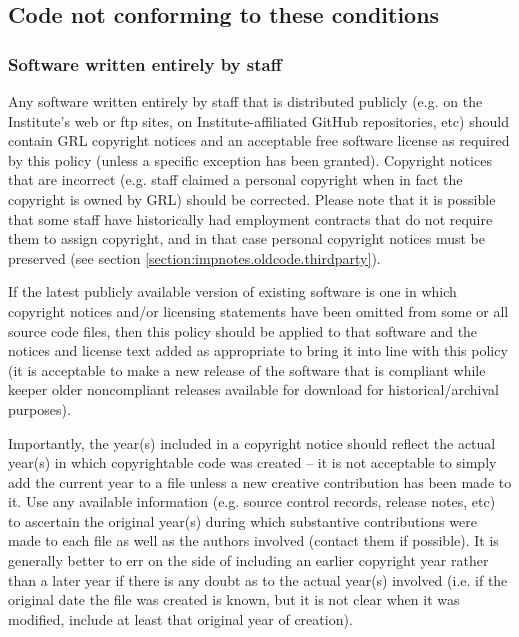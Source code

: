 \documentclass[10pt,a4paper]{article}
\begin{document}
\subsection{Code not conforming to these conditions}
\label{section:impnotes.oldcode}

\subsubsection{Software written entirely by staff}
\label{section:impnotes.oldcode.grlcopyright}
\par Any software written entirely by staff that is distributed publicly (e.g. on the 
Institute's web or ftp sites, on Institute-affiliated GitHub repositories, etc) 
should contain GRL copyright notices and an acceptable free software license 
as required by this policy (unless a specific exception has been granted). 
Copyright notices that are incorrect (e.g. staff claimed a personal copyright 
when in fact the copyright is owned by GRL) should be corrected. Please 
note that it is possible that some staff have historically had employment 
contracts that do not require them to assign copyright, and in that case 
personal copyright notices must be preserved (see section 
\ref{section:impnotes.oldcode.thirdparty}).

\par If the latest publicly available version of existing software is one in which  
copyright notices and/or licensing statements have been omitted from some or 
all source code files, then this policy should be applied to that software and 
the notices and license text added as appropriate to bring it into line with this 
policy (it is acceptable to make a new release of the software that is compliant 
while keeper older noncompliant releases available for download for 
historical/archival purposes). 

\par Importantly, the year(s) included in a copyright notice should reflect the 
actual year(s) in which copyrightable code was created -- it is not acceptable 
to simply add the current year to a file unless a new creative contribution has 
been made to it. Use any available information (e.g. source control records, 
release notes, etc) to ascertain the original year(s) during which substantive 
contributions were made to each file as well as the authors involved (contact 
them if possible). It is generally better to err on the side of including an earlier 
copyright year rather than a later year if there is any doubt as to the actual year(s) 
involved (i.e. if the original date the file was created is known, but it is not clear 
when it was modified, include at least that original year of creation). 
\end{document}
